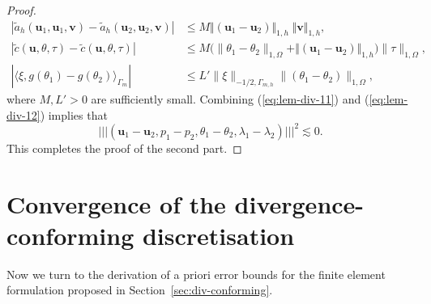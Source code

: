 \documentclass[onefignum,onetabnum,reqno,a4paper,final]{siamart250211}
\newcommand\bu{\boldsymbol{u}}
\newcommand\bv{\boldsymbol{v}}
\newcommand\0{\mathbf{0}}
\newcommand{\cred}[1]{{\leavevmode\color{red}{#1}}}
\newcommand{\triplenorm}[1]{\lvert\!\lvert\!\lvert #1
  \rvert\!\rvert\!\rvert}
\numberwithin{figure}{section}
\numberwithin{table}{section}
\begin{document}
\begin{proof}
\begin{subequations}
      \begin{align}
      |\widetilde{a}_h(\bu_1,\bu_1,\bv)-\widetilde{a}_h(\bu_2,\bu_2,\bv)|&\le M \Vert(\bu_1-{\bu}_2)\Vert_{1,h}\;\Vert\bv\Vert_{1,h},\\
      |\widetilde{c}(\bu,\theta,\tau)-\widetilde{c}(\bu,\theta,\tau)|&\le M \big(\|\theta_1-{\theta}_2\|_{1,\Omega}+\Vert(\bu_1-{\bu}_2)\Vert_{1,h}\big)\|\tau\|_{1,\Omega},\\
      |\langle \xi, g(\theta_1)-g(\theta_2)\rangle_{\Gamma_m}|&\le L'\|\xi\|_{-1/2,\Gamma_{m,h}}\|(\theta_1-{\theta}_2)\|_{1,\Omega},%
      \end{align}          
      \end{subequations}
      where $M,L'>0$ are sufficiently small. 
       Combining (\ref{eq:lem-div-11}) and (\ref{eq:lem-div-12}) implies that
      $$
       \triplenorm{({\bu}_1-\bu_2,{p}_1-p_2,{\theta}_1-\theta_2,{\lambda}_1-\lambda_2)}^2 \lesssim 0.
      $$
      This completes the proof of the second part. 
	\end{proof}
  
	\section{Convergence of the divergence-conforming discretisation}\label{sec:cv}
	Now we turn to the derivation of a priori error bounds for the finite  element formulation proposed in  Section~\ref{sec:div-conforming}.  
\end{document}

